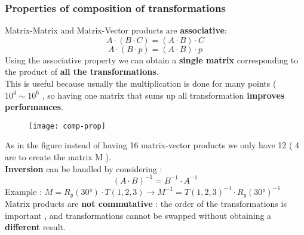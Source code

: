 \subsubsection{Properties of composition of transformations}
Matrix-Matrix and Matrix-Vector products are \textbf{associative}:
$$ A \cdot (B \cdot C) = (A \cdot B) \cdot C$$
$$ A \cdot (B \cdot p) = (A \cdot B) \cdot p$$
Using the associative property we can obtain a \textbf{single matrix} corresponding to the product of \textbf{all the transformations}.\\
This is useful because usually the multiplication is done for many points ($ 10^4 \sim 10^6$ , so having one matrix that sums up all transformation \textbf{improves performances}.\\
\begin{figure}[H]
  \centering
  \texttt{[image: comp-prop]}
\end{figure}
As in the figure instead of having 16 matrix-vector products we only have 12 ( 4 are to create the matrix M ).\\
\textbf{Inversion} can be handled by considering : $$ (A \cdot B)^{-1} = B^{-1} \cdot A^{-1}$$
Example : $M= R_y(\ang{30}) \cdot T(1,2,3) \to M^{-1}= T(1,2,3)^{-1} \cdot R_y(\ang{30})^{-1}$
Matrix products are \textbf{not commutative} : the order of the transformations is important , and transformations cannot be swapped without obtaining a \textbf{different } result.
\newpage
